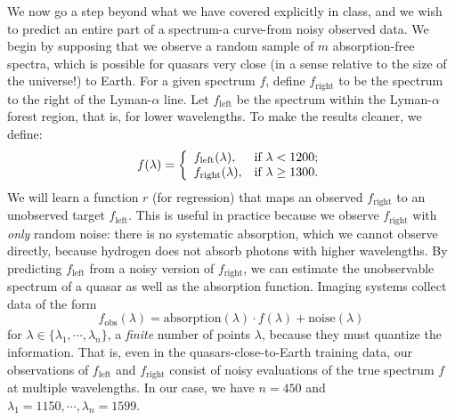 \documentclass[11pt]{article}
\begin{document}
We now go a step beyond what we have covered explicitly in class, and we wish to predict an entire part of a spectrum-a curve-from noisy observed data. We begin by supposing that we observe a random sample of $m$ absorption-free spectra, which is possible for quasars very close (in a sense relative to the size of the universe!) to Earth. For a given spectrum $f$, define $f_\text{right}$ to be the spectrum to the right of the Lyman-$\alpha$ line. Let $f_\text{left}$ be the spectrum within the Lyman-$\alpha$ forest region, that is, for lower wavelengths. To make the results cleaner, we define:$$f(\lambda) = \left\{
                                                     \begin{array}{ll}
                                                       f_\text{left}(\lambda), & \hbox{if $\lambda <1200$;} \\
                                                       f_\text{right}(\lambda), & \hbox{if $\lambda \geq 1300$.}
                                                     \end{array}
                                                   \right.$$
We will learn a function $r$ (for regression) that maps an observed $f_\text{right}$ to an unobserved target $f_\text{left}$. This is useful in practice because we observe $f_\text{right}$ with \emph{only} random noise: there is no systematic absorption, which we cannot observe directly, because hydrogen does not absorb photons with higher wavelengths. By predicting $f_\text{left}$ from a noisy version of $f_\text{right}$, we can estimate the unobservable spectrum of a quasar as well as the absorption function. Imaging systems collect data of the form
$$f_\text{obs}(\lambda) = \text{absorption}(\lambda) \cdot f(\lambda) + \text{noise}(\lambda)$$
for $\lambda \in \{\lambda_1, \cdots, \lambda_n\}$, a \emph{finite} number of points $\lambda$, because they must quantize the information. That is, even in the quasars-close-to-Earth training data, our observations of $f_\text{left}$ and $f_\text{right}$ consist of noisy evaluations of the true spectrum $f$ at multiple wavelengths. In our case, we have $n = 450$ and $\lambda_1 = 1150, \cdots, \lambda_n = 1599$.
\end{document}
